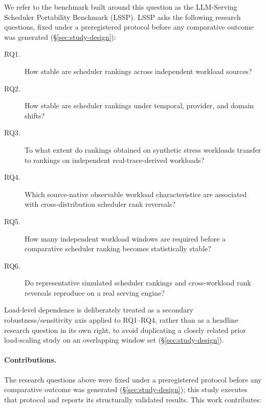 \documentclass[sn-basic,Numbered,pdflatex]{sn-jnl}
\begin{document}
We refer to the benchmark built around this question as the LLM-Serving
Scheduler Portability Benchmark (LSSP). LSSP asks the following research
questions, fixed under a preregistered protocol before any comparative
outcome was generated (\S\ref{sec:study-design}):

\begin{description}
  \item[RQ1.] How stable are scheduler rankings across independent
    workload sources?
  \item[RQ2.] How stable are scheduler rankings under temporal, provider,
    and domain shifts?
  \item[RQ3.] To what extent do rankings obtained on synthetic stress
    workloads transfer to rankings on independent real-trace-derived
    workloads?
  \item[RQ4.] Which source-native observable workload characteristics are
    associated with cross-distribution scheduler rank reversals?
  \item[RQ5.] How many independent workload windows are required before a
    comparative scheduler ranking becomes statistically stable?
  \item[RQ6.] Do representative simulated scheduler rankings and
    cross-workload rank reversals reproduce on a real serving engine?
\end{description}

Load-level dependence is deliberately treated as a secondary
robustness/sensitivity axis applied to RQ1--RQ4, rather than as a headline
research question in its own right, to avoid duplicating a closely related
prior load-scaling study on an overlapping window set
(\S\ref{sec:study-design}).

\paragraph{Contributions.} The research questions above were fixed under a
preregistered protocol before any comparative outcome was generated
(\S\ref{sec:study-design}); this study executes that protocol and reports
its structurally validated results. This work contributes:
\end{document}
